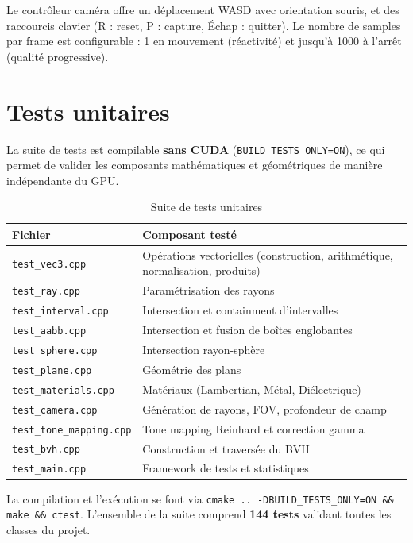 \documentclass[12pt,a4paper]{article}
\begin{document}
Le contrôleur caméra offre un déplacement WASD avec orientation souris,
et des raccourcis clavier (R : reset, P : capture, Échap : quitter).
Le nombre de samples par frame est configurable : 1 en mouvement (réactivité)
et jusqu'à 1000 à l'arrêt (qualité progressive).

\section{Tests unitaires}

La suite de tests est compilable \textbf{sans CUDA} (\texttt{BUILD\_TESTS\_ONLY=ON}),
ce qui permet de valider les composants mathématiques et géométriques de manière
indépendante du GPU.

\begin{table}[H]
\centering
\begin{tabular}{ll}
\toprule
\textbf{Fichier} & \textbf{Composant testé} \\
\midrule
\texttt{test\_vec3.cpp}     & Opérations vectorielles (construction, arithmétique, normalisation, produits) \\
\texttt{test\_ray.cpp}      & Paramétrisation des rayons \\
\texttt{test\_interval.cpp} & Intersection et containment d'intervalles \\
\texttt{test\_aabb.cpp}     & Intersection et fusion de boîtes englobantes \\
\texttt{test\_sphere.cpp}   & Intersection rayon-sphère \\
\texttt{test\_plane.cpp}    & Géométrie des plans \\
\texttt{test\_materials.cpp} & Matériaux (Lambertian, Métal, Diélectrique) \\
\texttt{test\_camera.cpp}    & Génération de rayons, FOV, profondeur de champ \\
\texttt{test\_tone\_mapping.cpp} & Tone mapping Reinhard et correction gamma \\
\texttt{test\_bvh.cpp}       & Construction et traversée du BVH \\
\texttt{test\_main.cpp}      & Framework de tests et statistiques \\
\bottomrule
\end{tabular}
\caption{Suite de tests unitaires}
\end{table}

La compilation et l'exécution se font via \texttt{cmake .. -DBUILD\_TESTS\_ONLY=ON \&\& make \&\& ctest}.
L'ensemble de la suite comprend \textbf{144 tests} validant toutes les classes du projet.
\end{document}
